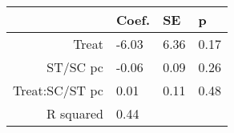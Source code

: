 \begin{tabular}{rlll}
  \hline
 & Coef. & SE & p \\ 
  \hline
Treat & -6.03 & 6.36 & 0.17 \\ 
  ST/SC pc & -0.06 & 0.09 & 0.26 \\ 
  Treat:SC/ST pc & 0.01 & 0.11 & 0.48 \\ 
  R squared & 0.44 &  &  \\ 
   \hline
\end{tabular}

